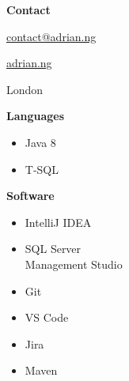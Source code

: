 \documentclass[letterpaper,11pt]{article}
\makeatletter
\newcommand{\resumeSubheading}[4]{
	\vspace{-1pt}\item
	\begin{tabular*}{0.97\textwidth}{l@{\extracolsep{\fill}}r}
		\textbf{#1} & #2 \\
		\textit{\small#3} & \textit{\small #4} \\
	\end{tabular*}\vspace{-5pt}
}
\newcommand{\resumeSubHeadingListStart}{\begin{itemize}[leftmargin=*]}
\newcommand{\resumeSubHeadingListEnd}{\end{itemize}}
\makeatother
\begin{document}
\hspace{0.2cm}
\begin{minipage}[c]{0.4\linewidth}
	\textbf{Contact}
	\begin{description}[style=multiline,leftmargin=1.5cm]
		\tiny
		\item[Email] \href{mailto:contact@adrian.ng}{contact@adrian.ng}
		\item[Website] \href{https://adrian.ng}{adrian.ng}
		\item[Location] London
	\end{description}
	\textbf{Languages}
	\begin{itemize}[leftmargin=*]
		\tiny
		\item Java 8
		\item T-SQL

	\end{itemize}
	\textbf{Software}
	\begin{itemize}[leftmargin=*]
		\tiny
		\item IntelliJ IDEA
		\item SQL Server\\Management Studio
		\item Git
		\item VS Code
		\item Jira
		\item Maven
	\end{itemize}
\end{minipage}




\end{document}

